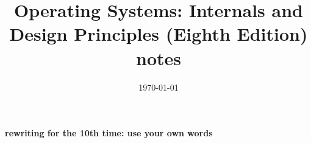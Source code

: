 \documentclass{article}
\title{Operating Systems: Internals and Design Principles (Eighth Edition) notes}
\date{\today}
\begin{document}
\maketitle

\textbf{rewriting for the 10th time: use your own words}
\end{document}
